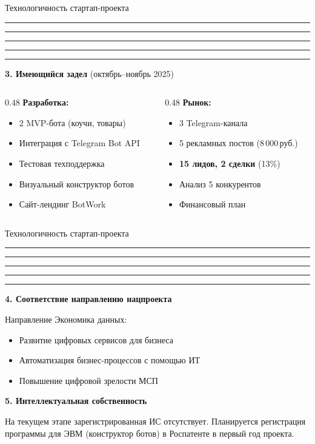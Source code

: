 \documentclass[aspectratio=169, 11pt]{beamer}
\newcommand{\cbar}{%
  \textcolor{cPink}{\rule{0.2\linewidth}{2pt}}%
  \textcolor{cPurple}{\rule{0.2\linewidth}{2pt}}%
  \textcolor{cRed}{\rule{0.2\linewidth}{2pt}}%
  \textcolor{cOrange}{\rule{0.2\linewidth}{2pt}}%
  \textcolor{cBlue}{\rule{0.2\linewidth}{2pt}}\par\medskip}
\newcommand{\R}{\,руб.}
\begin{document}
\begin{frame}{Технологичность стартап-проекта}
\cbar
\textbf{3. Имеющийся задел} (октябрь--ноябрь 2025)

\begin{columns}[T]
\begin{column}{0.48\textwidth}
\textbf{\textcolor{cGray}{Разработка:}}
\begin{itemize}\setlength\itemsep{0pt}
  \item 2 MVP-бота (коучи, товары)
  \item Интеграция с Telegram Bot API
  \item Тестовая техподдержка
  \item Визуальный конструктор ботов
  \item Сайт-лендинг BotWork
\end{itemize}
\end{column}
\begin{column}{0.48\textwidth}
\textbf{\textcolor{cGray}{Рынок:}}
\begin{itemize}\setlength\itemsep{0pt}
  \item 3 Telegram-канала
  \item 5 рекламных постов (8\,000\R)
  \item \textbf{15 лидов, 2 сделки} (13\%)
  \item Анализ 5 конкурентов
  \item Финансовый план
\end{itemize}
\end{column}
\end{columns}
\end{frame}

\begin{frame}{Технологичность стартап-проекта}
\cbar
\textbf{4. Соответствие направлению нацпроекта}

\medskip
Направление \guillemotleft{}Экономика данных\guillemotright{}:
\begin{itemize}\setlength\itemsep{0pt}
  \item Развитие цифровых сервисов для бизнеса
  \item Автоматизация бизнес-процессов с помощью ИТ
  \item Повышение цифровой зрелости МСП
\end{itemize}

\bigskip
\textbf{5. Интеллектуальная собственность}

\medskip
На текущем этапе зарегистрированная ИС отсутствует.
Планируется регистрация программы для ЭВМ (конструктор ботов) в Роспатенте в первый год проекта.
\end{frame}
\end{document}
